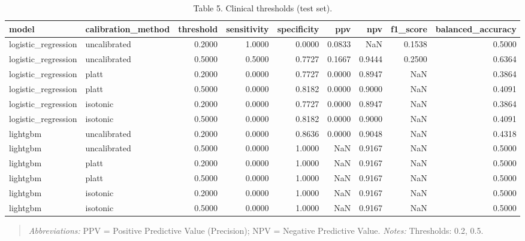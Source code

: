 \begin{table}[htbp]
\centering
\caption{Table 5. Clinical thresholds (test set).}
\label{table5_clinical_thresholds}
\begin{tabular}{llrrrrrrr}
\toprule
model & calibration\_method & threshold & sensitivity & specificity & ppv & npv & f1\_score & balanced\_accuracy \\
\midrule
logistic\_regression & uncalibrated & 0.2000 & 1.0000 & 0.0000 & 0.0833 & NaN & 0.1538 & 0.5000 \\
logistic\_regression & uncalibrated & 0.5000 & 0.5000 & 0.7727 & 0.1667 & 0.9444 & 0.2500 & 0.6364 \\
logistic\_regression & platt & 0.2000 & 0.0000 & 0.7727 & 0.0000 & 0.8947 & NaN & 0.3864 \\
logistic\_regression & platt & 0.5000 & 0.0000 & 0.8182 & 0.0000 & 0.9000 & NaN & 0.4091 \\
logistic\_regression & isotonic & 0.2000 & 0.0000 & 0.7727 & 0.0000 & 0.8947 & NaN & 0.3864 \\
logistic\_regression & isotonic & 0.5000 & 0.0000 & 0.8182 & 0.0000 & 0.9000 & NaN & 0.4091 \\
lightgbm & uncalibrated & 0.2000 & 0.0000 & 0.8636 & 0.0000 & 0.9048 & NaN & 0.4318 \\
lightgbm & uncalibrated & 0.5000 & 0.0000 & 1.0000 & NaN & 0.9167 & NaN & 0.5000 \\
lightgbm & platt & 0.2000 & 0.0000 & 1.0000 & NaN & 0.9167 & NaN & 0.5000 \\
lightgbm & platt & 0.5000 & 0.0000 & 1.0000 & NaN & 0.9167 & NaN & 0.5000 \\
lightgbm & isotonic & 0.2000 & 0.0000 & 1.0000 & NaN & 0.9167 & NaN & 0.5000 \\
lightgbm & isotonic & 0.5000 & 0.0000 & 1.0000 & NaN & 0.9167 & NaN & 0.5000 \\
\bottomrule
\end{tabular}

\end{table}


\begin{quote}\small
\textit{Abbreviations:} PPV = Positive Predictive Value (Precision); NPV = Negative Predictive Value.
\textit{Notes:} Thresholds: 0.2, 0.5.
\end{quote}